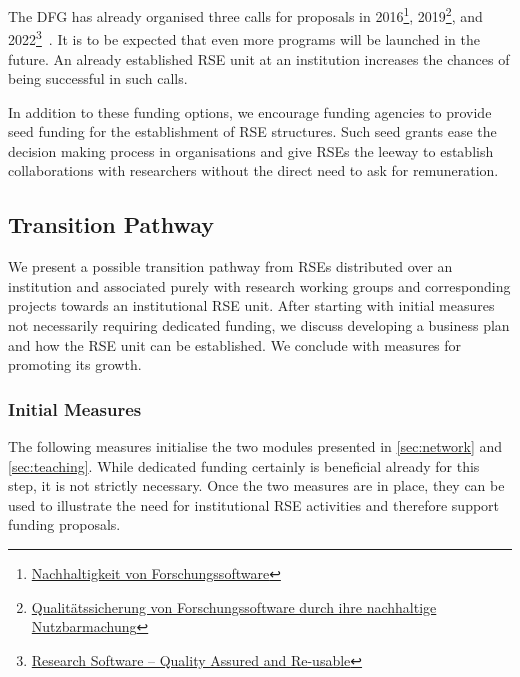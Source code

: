 \documentclass[a4paper]{article}
\begin{document}
\begin{enumerate}
      The DFG has already organised three calls for proposals in 2016\footnote{\href{https://www.dfg.de/resource/blob/172674/1bcb181a6451fdac9d94421776b52798/161026-dfg-ausschreibung-forschungssoftware-de-data.pdf}{Nachhaltigkeit von Forschungssoftware}}, 2019\footnote{\href{https://www.dfg.de/de/aktuelles/neuigkeiten-themen/info-wissenschaft/2019/info-wissenschaft-19-44}{Qualitätssicherung von Forschungssoftware durch ihre nachhaltige Nutzbarmachung}}, and 2022\footnote{\href{https://www.dfg.de/en/news/news-topics/announcements-proposals/2022/info-wissenschaft-22-85}{Research Software – Quality Assured and Re-usable}}~\autocite{katerbow_dfg_rse_funding_2018}.
      It is to be expected that even more programs will be launched in the future.
      An already established RSE unit at an institution increases the chances of being successful in such calls.
\end{enumerate}

In addition to these funding options, we encourage funding agencies to provide seed funding for the establishment of RSE structures.
Such seed grants ease the decision making process in organisations and give RSEs the leeway to establish collaborations with researchers without the direct need to ask for remuneration.

\subsection{Transition Pathway}

We present a possible transition pathway from RSEs distributed over an institution and associated purely with research working groups and corresponding projects towards an institutional RSE unit.
After starting with initial measures not necessarily requiring dedicated funding, we discuss developing a business plan and how the RSE unit can be established.
We conclude with measures for promoting its growth.

\subsubsection{Initial Measures}
The following measures initialise the two modules presented in \autoref{sec:network} and \autoref{sec:teaching}.
While dedicated funding certainly is beneficial already for this step, it is not strictly necessary.
Once the two measures are in place, they can be used to illustrate the need for institutional RSE activities and therefore support funding proposals.
\end{document}

